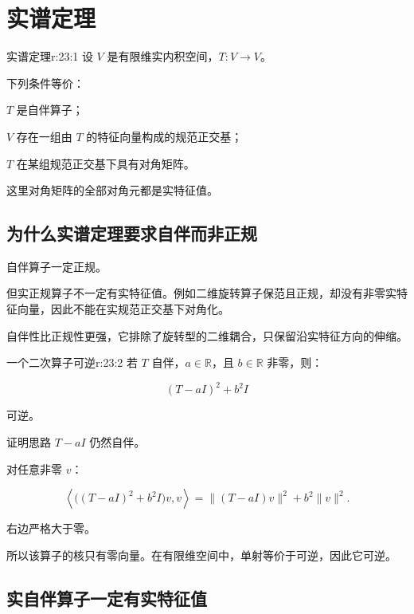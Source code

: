 
\chapter{实谱定理}


\begin{jthm}{实谱定理}{r:23:1}
设 $V$ 是有限维实内积空间，$T:V\to V$。

下列条件等价：

\begin{jenum}
\item %
$T$ 是自伴算子；
\item %
$V$ 存在一组由 $T$ 的特征向量构成的规范正交基；
\item %
$T$ 在某组规范正交基下具有对角矩阵。
\end{jenum}

这里对角矩阵的全部对角元都是实特征值。
\end{jthm}

\section{为什么实谱定理要求自伴而非正规}

自伴算子一定正规。

但实正规算子不一定有实特征值。例如二维旋转算子保范且正规，却没有非零实特征向量，因此不能在实规范正交基下对角化。

自伴性比正规性更强，它排除了旋转型的二维耦合，只保留沿实特征方向的伸缩。

\begin{jprop}{一个二次算子可逆}{r:23:2}
若 $T$ 自伴，$a\in\mathbb R$，且 $b\in\mathbb R$ 非零，则：

\[
(T-aI)^2+b^2I
\]

可逆。
\end{jprop}

\begin{jproof}{证明思路}
$T-aI$ 仍然自伴。

对任意非零 $v$：

\[
\left\langle
\bigl((T-aI)^2+b^2I\bigr)v,v
\right\rangle
=
\|(T-aI)v\|^2+b^2\|v\|^2.
\]

右边严格大于零。

所以该算子的核只有零向量。在有限维空间中，单射等价于可逆，因此它可逆。
\end{jproof}

\section{实自伴算子一定有实特征值}


